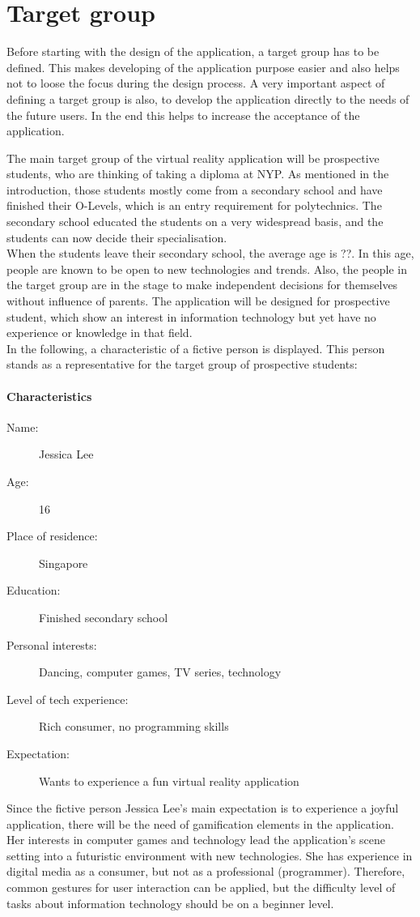\section{Target group}
Before starting with the design of the application, a target group has to be defined. This makes developing of the application purpose easier and also helps not to loose the focus during the design process. A very important aspect of defining a target group is also, to develop the application directly to the needs of the future users. In the end this helps to increase the acceptance of the application. 

The main target group of the virtual reality application will be prospective students, who are thinking of taking a diploma at NYP. As mentioned in the introduction, those students mostly come from a secondary school and have finished their O-Levels, which is an entry requirement for polytechnics. The secondary school educated the students on a very widespread basis, and the students can now decide their specialisation. \\
When the students leave their secondary school, the average age is ??. In this age, people are known to be open to new technologies and trends. Also, the people in the target group are in the stage to make independent decisions for themselves without influence of parents. The application will be designed for prospective student, which show an interest in information technology but yet have no experience or knowledge in that field.\\
In the following, a characteristic of a fictive person is displayed. This person stands as a representative for the target group of prospective students:

\paragraph{Characteristics}
\begin{description}
	\item[Name:] Jessica Lee
	\item[Age:] 16
	\item[Place of residence:] Singapore
	\item[Education:] Finished secondary school
	\item[Personal interests:] Dancing, computer games, TV series, technology
	\item[Level of tech experience:] Rich consumer, no programming skills
	\item[Expectation:] Wants to experience a fun virtual reality application
\end{description}
Since the fictive person Jessica Lee's main expectation is to experience a joyful application, there will be the need of gamification elements in the application. Her interests in computer games and technology lead the application's scene setting into a futuristic environment with new technologies. She has experience in digital media as a consumer, but not as a professional (programmer). Therefore, common gestures for user interaction can be applied, but the difficulty level of tasks about information technology should be on a beginner level. 
